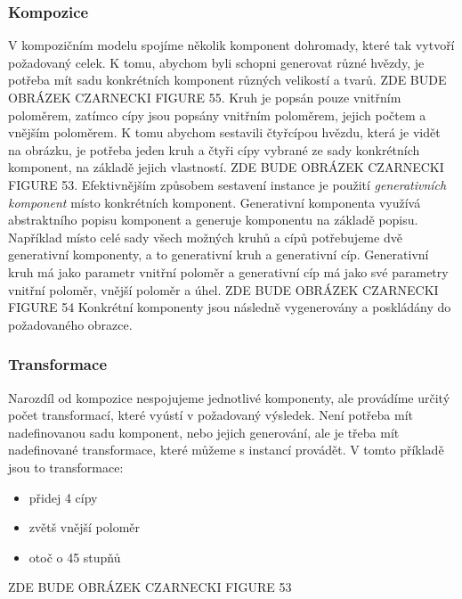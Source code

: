 \subsubsection{Kompozice}
V kompozičním modelu spojíme několik komponent dohromady, které tak vytvoří požadovaný celek. K tomu, abychom byli schopni generovat různé hvězdy, je potřeba mít sadu konkrétních komponent různých velikostí a tvarů.
\newline
\newline
ZDE BUDE OBRÁZEK CZARNECKI FIGURE 55.
\newline
\newline
Kruh je popsán pouze vnitřním poloměrem, zatímco cípy jsou popsány vnitřním poloměrem, jejich počtem a vnějším poloměrem. K tomu abychom sestavili čtyřcípou hvězdu, která je vidět na obrázku, je potřeba jeden kruh a čtyři cípy vybrané ze sady konkrétních komponent, na základě jejich vlastností.
\newline
\newline
ZDE BUDE OBRÁZEK CZARNECKI FIGURE 53.
\newline
\newline
Efektivnějším způsobem sestavení instance je použití \textit{generativních komponent} místo konkrétních komponent. Generativní komponenta využívá abstraktního popisu komponent a generuje komponentu na základě popisu. Například místo celé sady všech možných kruhů a cípů potřebujeme dvě generativní komponenty, a to generativní kruh a generativní cíp. Generativní kruh má jako parametr vnitřní poloměr a generativní cíp má jako své parametry vnitřní poloměr, vnější poloměr a úhel.
\newline
\newline
ZDE BUDE OBRÁZEK CZARNECKI FIGURE 54
\newline
\newline
Konkrétní komponenty jsou následně vygenerovány a poskládány do požadovaného obrazce.

\subsubsection{Transformace}
Narozdíl od kompozice nespojujeme jednotlivé komponenty, ale provádíme určitý počet transformací, které vyústí v požadovaný výsledek. Není potřeba mít nadefinovanou sadu komponent, nebo jejich generování, ale je třeba mít nadefinované transformace, které můžeme s instancí provádět. V tomto příkladě jsou to transformace: 
\begin{itemize}
	\item přidej 4 cípy
	\item zvětš vnější poloměr
	\item otoč o 45 stupňů
\end{itemize}
ZDE BUDE OBRÁZEK CZARNECKI FIGURE 53

